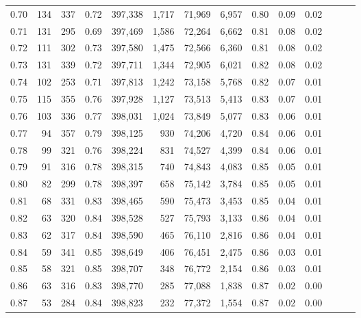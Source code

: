 \begin{tabular}{rrrrrrrrrrrrrr}
0.70 &     134 &    337 &  0.72 &  397,338 &    1,717 &  71,969 &   6,957 &  0.80 &  0.09 &      0.02 \\
0.71 &     131 &    295 &  0.69 &  397,469 &    1,586 &  72,264 &   6,662 &  0.81 &  0.08 &      0.02 \\
0.72 &     111 &    302 &  0.73 &  397,580 &    1,475 &  72,566 &   6,360 &  0.81 &  0.08 &      0.02 \\
0.73 &     131 &    339 &  0.72 &  397,711 &    1,344 &  72,905 &   6,021 &  0.82 &  0.08 &      0.02 \\
0.74 &     102 &    253 &  0.71 &  397,813 &    1,242 &  73,158 &   5,768 &  0.82 &  0.07 &      0.01 \\
0.75 &     115 &    355 &  0.76 &  397,928 &    1,127 &  73,513 &   5,413 &  0.83 &  0.07 &      0.01 \\
0.76 &     103 &    336 &  0.77 &  398,031 &    1,024 &  73,849 &   5,077 &  0.83 &  0.06 &      0.01 \\
0.77 &      94 &    357 &  0.79 &  398,125 &      930 &  74,206 &   4,720 &  0.84 &  0.06 &      0.01 \\
0.78 &      99 &    321 &  0.76 &  398,224 &      831 &  74,527 &   4,399 &  0.84 &  0.06 &      0.01 \\
0.79 &      91 &    316 &  0.78 &  398,315 &      740 &  74,843 &   4,083 &  0.85 &  0.05 &      0.01 \\
0.80 &      82 &    299 &  0.78 &  398,397 &      658 &  75,142 &   3,784 &  0.85 &  0.05 &      0.01 \\
0.81 &      68 &    331 &  0.83 &  398,465 &      590 &  75,473 &   3,453 &  0.85 &  0.04 &      0.01 \\
0.82 &      63 &    320 &  0.84 &  398,528 &      527 &  75,793 &   3,133 &  0.86 &  0.04 &      0.01 \\
0.83 &      62 &    317 &  0.84 &  398,590 &      465 &  76,110 &   2,816 &  0.86 &  0.04 &      0.01 \\
0.84 &      59 &    341 &  0.85 &  398,649 &      406 &  76,451 &   2,475 &  0.86 &  0.03 &      0.01 \\
0.85 &      58 &    321 &  0.85 &  398,707 &      348 &  76,772 &   2,154 &  0.86 &  0.03 &      0.01 \\
0.86 &      63 &    316 &  0.83 &  398,770 &      285 &  77,088 &   1,838 &  0.87 &  0.02 &      0.00 \\
0.87 &      53 &    284 &  0.84 &  398,823 &      232 &  77,372 &   1,554 &  0.87 &  0.02 &      0.00 \\

\end{tabular}
